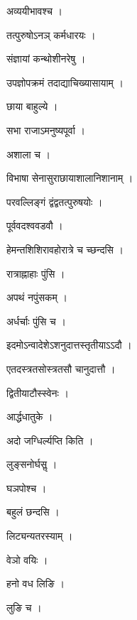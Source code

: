 \documentclass[10pt, openany]{book}
\begin{document}
\noindent अव्ययीभावश्च ।

\noindent तत्पुरुषोऽनञ् कर्मधारयः ।

\noindent संज्ञायां कन्थोशीनरेषु ।

\noindent उपज्ञोपक्रमं तदाद्याचिख्यासायाम् ।

\noindent छाया बाहुल्ये ।

\noindent सभा राजाऽमनुष्यपूर्वा ।

\noindent अशाला च ।

\noindent विभाषा सेनासुराछायाशालानिशानाम् ।

\noindent परवल्लिङ्गं द्वंद्वतत्पुरुषयोः ।

\noindent पूर्ववदश्ववडवौ ।

\noindent हेमन्तशिशिरावहोरात्रे च च्छन्दसि ।

\noindent रात्राह्नाहाः पुंसि ।

\noindent अपथं नपुंसकम् ।

\noindent अर्धर्चाः पुंसि च ।

\noindent इदमोऽन्वादेशेऽशनुदात्तस्तृतीयाऽऽदौ ।

\noindent एतदस्त्रतसोस्त्रतसौ चानुदात्तौ ।

\noindent द्वितीयाटौस्स्वेनः ।

\noindent आर्द्धधातुके ।

\noindent अदो जग्धिर्ल्यप्ति किति ।

\noindent लुङ्सनोर्घसॢ ।

\noindent घञपोश्च ।

\noindent बहुलं छन्दसि ।

\noindent लिट्यन्यतरस्याम् ।

\noindent वेञो वयिः ।

\noindent हनो वध लिङि ।

\noindent लुङि च ।
\end{document}
